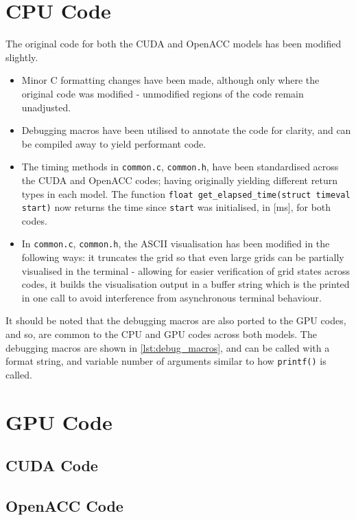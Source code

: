 \documentclass{article}
\newcommand{\lilf}[1]{\lstinline[style=ff]{#1}}
\begin{document}
\section{CPU Code}
\label{sec:cpu-code}

The original code for both the CUDA and OpenACC models has been modified
slightly.
\begin{itemize}
\item
  Minor C formatting changes have been made, although only where the original
  code was modified - unmodified regions of the code remain unadjusted.

\item
  Debugging macros have been utilised to annotate the code for clarity, and can
  be compiled away to yield performant code.

\item
  The timing methods in \lilf{common.c}, \lilf{common.h}, have been
  standardised across the CUDA and OpenACC codes; having originally yielding
  different return types in each model.
  The function \lstinline{float get_elapsed_time(struct timeval start)} now
  returns the time since \lstinline{start} was initialised, in
  [\si{\milli\second}], for both codes.

\item
  In \lilf{common.c}, \lilf{common.h}, the ASCII visualisation has been modified
  in the following ways: it truncates the grid so that even large grids can be
  partially visualised in the terminal - allowing for easier verification of
  grid states across codes, it builds the visualisation output in a buffer
  string which is the printed in one call to avoid interference from
  asynchronous terminal behaviour.

\end{itemize}

It should be noted that the debugging macros are also ported to the GPU codes,
and so, are common to the CPU and GPU codes across both models.
The debugging macros are shown in \autoref{lst:debug_macros}, and can be called
with a format string, and variable number of arguments similar to how
\lstinline{printf()} is called.



\section{GPU Code}
\label{sec:Gpu-code}

\subsection{CUDA Code}
\label{sec:cuda-code}


\subsection{OpenACC Code}
\label{sec:cpu-code}

\end{document}

